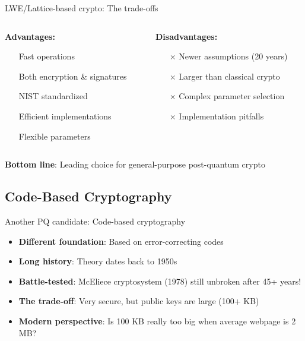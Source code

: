 \documentclass[aspectratio=169, lualatex, handout]{beamer}
\begin{document}
\begin{frame}{LWE/Lattice-based crypto: The trade-offs}
	\begin{columns}[c]
		\begin{column}{0.5\textwidth}
			\textbf{Advantages:}
			\begin{itemize}
				\item[\mycheckmark] Fast operations
				\item[\mycheckmark] Both encryption \& signatures
				\item[\mycheckmark] NIST standardized
				\item[\mycheckmark] Efficient implementations
				\item[\mycheckmark] Flexible parameters
			\end{itemize}
		\end{column}
		\begin{column}{0.5\textwidth}
			\textbf{Disadvantages:}
			\begin{itemize}
				\item[$\times$] Newer assumptions (20 years)
				\item[$\times$] Larger than classical crypto
				\item[$\times$] Complex parameter selection
				\item[$\times$] Implementation pitfalls
			\end{itemize}
		\end{column}
	\end{columns}
	\vspace{5mm}
	\begin{center}
		\textbf{Bottom line}: Leading choice for general-purpose post-quantum crypto
	\end{center}
\end{frame}

\subsection{Code-Based Cryptography}

\begin{frame}{Another PQ candidate: Code-based cryptography}
	\begin{itemize}
		\item \textbf{Different foundation}: Based on error-correcting codes
		\item \textbf{Long history}: Theory dates back to 1950s
		\item \textbf{Battle-tested}: McEliece cryptosystem (1978) still unbroken after 45+ years!
		\item \textbf{The trade-off}: Very secure, but public keys are large (100+ KB)
		\item \textbf{Modern perspective}: Is 100 KB really too big when average webpage is 2 MB?
	\end{itemize}
\end{frame}
\end{document}
